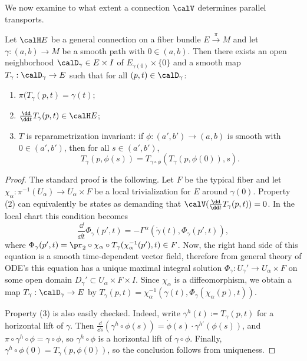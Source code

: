 We now examine to what extent a connection $\calV$ determines parallel transports.

\begin{thm}\label{prop parallel tra}
    Let $\calH E$ be a general connection on a fiber bundle $E\overset{\pi}{\to}M$ and let $\gamma:(a,b)\to M$ be a smooth path with $0\in(a,b)$. Then there exists an open neighborhood $\calD_\gamma\in E\times I$ of $E_{\gamma(0)}\times\{0\}$ and a smooth map $T_\gamma:\calD_\gamma\to E$ such that for all $(p,t)\in \calD_\gamma$: 
    \begin{enumerate}[label=(\arabic*)]
        \item $\pi(T_\gamma(p,t)=\gamma(t)$;
        \item $\frac{\dd}{\dd t}T_\gamma(p,t)\in \calH E$;
        \item $T$ is reparametrization invariant: if $\phi:(a',b')\to (a,b)$ is smooth with $0\in(a',b')$, then for all $s\in (a',b')$, 
        \[T_\gamma(p,\phi(s))=T_{\gamma\circ\phi}(T_\gamma(p,\phi(0)),s).\]
    \end{enumerate}
\end{thm}
\begin{proof}
    The standard proof is the following. Let $F$ be the typical fiber and let $\chi_\alpha:\pi^{-1}(U_\alpha)\to U_\alpha\times F$ be a local trivialization for $E$ around $\gamma(0)$. Property (2) can equivalently be states as demanding that $\calV(\frac{\dd}{\dd t}T_\gamma(p,t))=0$. In the local chart this condition becomes
    \[\frac{\dd}{\dd t}\Phi_\gamma(p',t)=-\varGamma^\alpha\left(\dot\gamma(t),\Phi_\gamma(p',t)\right),\]
    where $\Phi_\gamma(p',t)=\pr_2\circ \chi_\alpha\circ T_\gamma(\chi_\alpha^{-1}(p'),t)\in F$. Now, the right hand side of this equation is a smooth time-dependent vector field, therefore from general theory of ODE's this equation has a unique maximal integral solution $\Phi_\gamma:U_\gamma'\to U_\alpha\times F$ on some open domain $D_\gamma'\subset U_\alpha\times F\times I$. Since $\chi_\alpha$ is a diffeomorphism, we obtain a map $T_\gamma:\calD_\gamma\to E$ by $T_\gamma(p,t)=\chi_\alpha^{-1}(\gamma(t),\Phi_\gamma(\chi_\alpha(p),t))$.

    Property (3) is also easily checked. Indeed, write $\gamma^h(t)\coloneqq T_\gamma(p,t)$ for a horizontal lift of $\gamma$. Then $\frac{\dd}{\dd s}(\gamma^h\circ \phi(s))=\dot\phi(s)\cdot \gamma^{h\prime}(\phi(s))$, and $\pi\circ\gamma^h\circ\phi=\gamma\circ\phi$, so $\gamma^h\circ\phi$ is a horizontal lift of $\gamma\circ\phi$. Finally, $\gamma^h\circ\phi(0)=T_\gamma(p,\phi(0))$, so the conclusion follows from uniqueness.
\end{proof}


